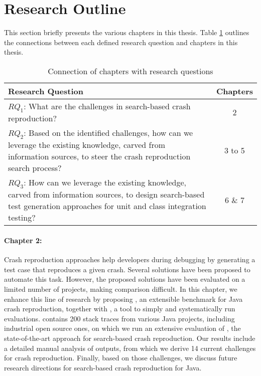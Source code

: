 \section{Research Outline}

This section briefly presents the various chapters in this thesis.
Table \ref{tab:chaptersvsRQs} outlines the connections between each defined research question and chapters in this thesis.


\begin{table}[!t]
\caption{Connection of chapters with research questions}
\label{tab:chaptersvsRQs}
\begin{tabular}{|p{}||c|}
\textbf{Research Question} & \textbf{Chapters}\\
\hline
\hline
$RQ_1$: What are the challenges in search-based crash reproduction? & 2\\
$RQ_2$: Based on the identified challenges, how can we leverage the existing knowledge, carved from information sources, to steer the crash reproduction search process? & 3 to 5\\
$RQ_3$: How can we leverage the existing knowledge, carved from information sources, to design search-based test generation approaches for unit and class integration testing? & 6 \& 7\\
\hline
\end{tabular}
\end{table}


\paragraph{Chapter 2:}%
Crash reproduction approaches help developers during debugging by generating a test case that reproduces a given crash. 
Several solutions have been proposed to automate this task.
However, the proposed solutions have been evaluated on a limited number of projects, making comparison difficult.
In this chapter, we enhance this line of research by proposing \crashpack, an extensible benchmark for Java crash reproduction, together with \exrunner, a tool to simply and systematically run evaluations.
\crashpack contains 200 stack traces from various Java projects, including industrial open source ones, on which we run an extensive evaluation of \evocrash, the state-of-the-art approach for search-based crash reproduction.
Our results include a detailed manual analysis of \evocrash outputs, from which we derive 14 current challenges for crash reproduction. 
Finally, based on those challenges, we discuss future research directions for search-based crash reproduction for Java.

